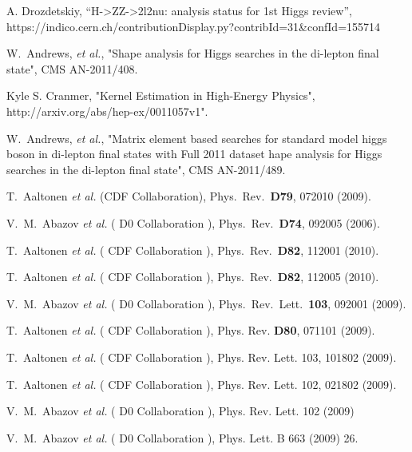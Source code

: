 A. Drozdetskiy, ``H->ZZ->2l2nu: analysis status for 1st Higgs review'', https://indico.cern.ch/contributionDisplay.py?contribId=31\&confId=155714


W.~Andrews, \textit{et al.}, "Shape analysis for Higgs searches in the di-lepton final state", CMS AN-2011/408.

Kyle S. Cranmer, "Kernel Estimation in High-Energy Physics", {http://arxiv.org/abs/hep-ex/0011057v1"}.

W.~Andrews, \textit{et al.}, "Matrix element based searches for standard model higgs boson in di-lepton final states with Full 2011 
dataset hape analysis for Higgs searches in the di-lepton final state", CMS AN-2011/489.

%
%

T.~Aaltonen {\it et al.} (CDF Collaboration),  Phys.\ Rev.\  {\bf D79}, 072010 (2009).

V.~M.~Abazov {\it et al.} ( D0 Collaboration ), Phys.\ Rev.\  {\bf D74}, 092005 (2006).

T.~Aaltonen {\it et al.} ( CDF Collaboration ), Phys.\ Rev.\  {\bf D82}, 112001 (2010).

T.~Aaltonen {\it et al.} ( CDF Collaboration ), Phys.\ Rev.\  {\bf D82}, 112005 (2010).

V.~M.~Abazov {\it et al.} ( D0 Collaboration ), Phys.\ Rev.\ Lett.\  {\bf 103}, 092001 (2009).

T.~Aaltonen {\it et al.} ( CDF Collaboration ), Phys. Rev. {\bf D80}, 071101 (2009).

T.~Aaltonen {\it et al.} ( CDF Collaboration ), Phys. Rev. Lett. 103, 101802 (2009).

T.~Aaltonen {\it et al.} ( CDF Collaboration ), Phys. Rev. Lett. 102, 021802 (2009).

V.~M.~Abazov {\it et al.} ( D0 Collaboration ), Phys. Rev. Lett. 102 (2009)

V.~M.~Abazov {\it et al.} ( D0 Collaboration ), Phys. Lett. B 663 (2009) 26.

